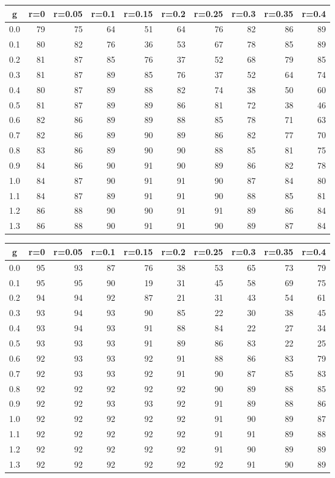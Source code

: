 %
\begin{table}[!tbp]
 \begin{center}
 \begin{tabular}{rrrrrrrrrr}\hline\hline
\multicolumn{1}{c}{g}&\multicolumn{1}{c}{r=0}&\multicolumn{1}{c}{r=0.05}&\multicolumn{1}{c}{r=0.1}&\multicolumn{1}{c}{r=0.15}&\multicolumn{1}{c}{r=0.2}&\multicolumn{1}{c}{r=0.25}&\multicolumn{1}{c}{r=0.3}&\multicolumn{1}{c}{r=0.35}&\multicolumn{1}{c}{r=0.4}\tabularnewline
\hline
0.0&79&75&64&51&64&76&82&86&89\tabularnewline
0.1&80&82&76&36&53&67&78&85&89\tabularnewline
0.2&81&87&85&76&37&52&68&79&85\tabularnewline
0.3&81&87&89&85&76&37&52&64&74\tabularnewline
0.4&80&87&89&88&82&74&38&50&60\tabularnewline
0.5&81&87&89&89&86&81&72&38&46\tabularnewline
0.6&82&86&89&89&88&85&78&71&63\tabularnewline
0.7&82&86&89&90&89&86&82&77&70\tabularnewline
0.8&83&86&89&90&90&88&85&81&75\tabularnewline
0.9&84&86&90&91&90&89&86&82&78\tabularnewline
1.0&84&87&90&91&91&90&87&84&80\tabularnewline
1.1&84&87&89&91&91&90&88&85&81\tabularnewline
1.2&86&88&90&90&91&91&89&86&84\tabularnewline
1.3&86&88&90&91&91&90&89&87&84\tabularnewline
\hline
\end{tabular}

\end{center}

\end{table}

%
\begin{table}[!tbp]
 \begin{center}
 \begin{tabular}{rrrrrrrrrr}\hline\hline
\multicolumn{1}{c}{g}&\multicolumn{1}{c}{r=0}&\multicolumn{1}{c}{r=0.05}&\multicolumn{1}{c}{r=0.1}&\multicolumn{1}{c}{r=0.15}&\multicolumn{1}{c}{r=0.2}&\multicolumn{1}{c}{r=0.25}&\multicolumn{1}{c}{r=0.3}&\multicolumn{1}{c}{r=0.35}&\multicolumn{1}{c}{r=0.4}\tabularnewline
\hline
0.0&95&93&87&76&38&53&65&73&79\tabularnewline
0.1&95&95&90&19&31&45&58&69&75\tabularnewline
0.2&94&94&92&87&21&31&43&54&61\tabularnewline
0.3&93&94&93&90&85&22&30&38&45\tabularnewline
0.4&93&94&93&91&88&84&22&27&34\tabularnewline
0.5&93&93&93&91&89&86&83&22&25\tabularnewline
0.6&92&93&93&92&91&88&86&83&79\tabularnewline
0.7&92&93&93&92&91&90&87&85&83\tabularnewline
0.8&92&92&92&92&92&90&89&88&85\tabularnewline
0.9&92&92&93&93&92&91&89&88&86\tabularnewline
1.0&92&92&92&92&92&91&90&89&87\tabularnewline
1.1&92&92&92&92&92&91&91&89&88\tabularnewline
1.2&92&92&92&92&92&91&90&89&89\tabularnewline
1.3&92&92&92&92&92&92&91&90&89\tabularnewline
\hline
\end{tabular}

\end{center}

\end{table}

